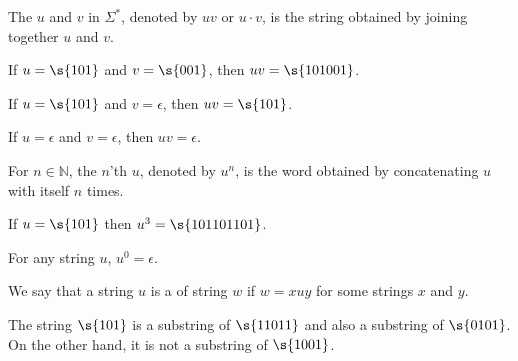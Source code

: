 \begin{flex}
\begin{definition} \label{definition:Concatenation-of-strings}
The  $u$ and $v$ in $\Sigma^*$, denoted by $uv$ or $u \cdot v$, is the string obtained by joining together $u$ and $v$. 
\end{definition}

\begin{example} \label{example:Concatenation-of-101-and-001}
If $u = \s{101}$ and $v = \s{001}$, then $uv = \s{101001}$.
\end{example}

\begin{example} \label{example:Concatenation-of-101-and-epsilon}
If $u = \s{101}$ and $v = \epsilon$, then $uv = \s{101}$.
\end{example}

\begin{example} \label{example:Concatenation-of-epsilon-and-epsilon}
If $u = \epsilon$ and $v = \epsilon$, then $uv = \epsilon$.
\end{example}
\end{flex}


\begin{flex}
\begin{definition} \label{definition:Powers-of-a-string}
For $n \in \mathbb{N}$, the $n$'th  $u$, denoted by $u^n$, is the word obtained by concatenating $u$ with itself $n$ times.
\end{definition}

\begin{example} \label{example:Third-power-of-101}
If $u = \s{101}$ then $u^3 = \s{101101101}$.
\end{example}

\begin{example} \label{example:Zeroth-power-of-a-string}
For any string $u$, $u^0 = \epsilon$.
\end{example}
\end{flex}


\begin{flex}
\begin{definition}[Substring] \label{definition:Substring}
We say that a string $u$ is a  of string $w$ if $w = xuy$ for some strings $x$ and $y$.
\end{definition}

\begin{example}[$101$ as a substring] \label{example:101-as-a-substring}
The string $\s{101}$ is a substring of $\s{11011}$ and also a substring of $\s{0101}$. 
On the other hand, it is not a substring of $\s{1001}$.
\end{example}
\end{flex}


